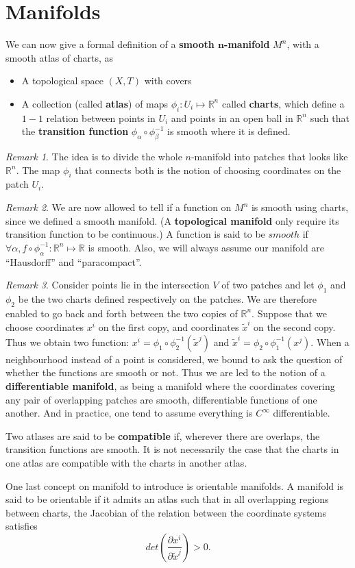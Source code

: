 \documentclass[a4paper,11pt]{article}
\theoremstyle{remark}
\newtheorem{remark}{Remark}[section]
\begin{document}
\section{Manifolds}
\label{s:mani}
We can now give a formal definition of a \textbf{smooth $\mathbf{n}$-manifold}
$M^n$, with a smooth atlas of charts, as
\begin{itemize}
\item A topological space $(X, T)$ with covers
\item A collection (called \textbf{atlas}) of maps $\phi_i: U_i
  \mapsto \mathbb{R}^n$ called \textbf{charts}, which define a $1-1$
  relation between points in $U_i$ and points in an open ball in
  $\mathbb{R}^n$ such that the \textbf{transition function}
  $\phi_{\alpha}\circ \phi^{-1}_{\beta}$ is smooth where it is
  defined.
\end{itemize}
\begin{remark}The idea is to divide the whole $n$-manifold into
  patches that looks like $\mathbb{R}^n$. The map $\phi_i$ that
  connects both is the notion of choosing coordinates on the patch
  $U_i$.
\end{remark}
\begin{remark}
  We are now allowed to tell if a function on $M^n$ is smooth using
  charts, since we defined a smooth manifold. (A \textbf{topological
    manifold} only require its transition function to be continuous.)
  A function is said to be $smooth$ if $\forall \alpha,
  f\circ\phi_{\alpha}^{-1}: \mathbb{R}^n\mapsto\mathbb{R}$ is
  smooth. Also, we will always assume our manifold are ``Hausdorff''
  and ``paracompact''.%
\end{remark}
\begin{remark}
  Consider points lie in the intersection $V$ of two patches and let
  $\phi_1$ and $\phi_2$ be the two charts defined respectively on the
  patches. We are therefore enabled to go back and forth between the
  two copies of $\mathbb{R}^n$. Suppose that we choose coordinates
  $x^i$ on the first copy, and coordinates $\tilde{x}^i$ on the second
  copy. Thus we obtain two function: $x^i =
  \phi_1\circ\phi_2^{-1}(\tilde{x}^j)$ and $\tilde{x}^i =
  \phi_2\circ\phi_1^{-1}(x^j)$. When a neighbourhood instead of a
  point is considered, we bound to ask the question of whether the
  functions are smooth or not. Thus we are led to the notion of a
  \textbf{differentiable manifold}, as being a manifold where the
  coordinates covering any pair of overlapping patches are smooth,
  differentiable functions of one another. And in practice, one tend
  to assume everything is $C^{\infty}$ differentiable.
\end{remark}\par
Two atlases are said to be \textbf{compatible} if, wherever there are
overlaps, the transition functions are smooth. It is not necessarily
the case that the charts in one atlas are compatible with the charts
in another atlas.\par
One last concept on manifold to introduce is orientable manifolds. A
manifold is said to be orientable if it admits an atlas such that in
all overlapping regions between charts, the Jacobian of the relation
between the coordinate systems satisfies$$det\left( \frac{\partial
    x^i}{\partial\tilde{x}^j} \right)>0.$$
\end{document}
